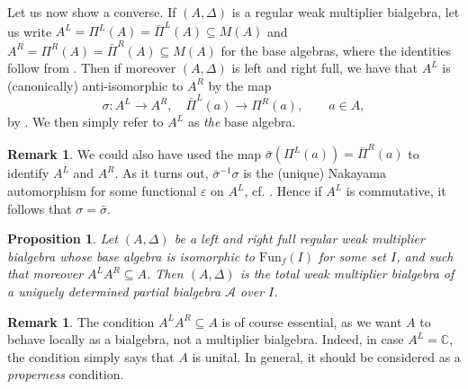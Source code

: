 \documentclass[10pt]{article}
\newcommand{\C}{\mathbb{C}}
\newcommand{\Fun}{\mathrm{Fun}}
\newtheorem{Prop}[Theorem]{Proposition}
\theoremstyle{definition}
\newtheorem{Rem}[Theorem]{Remark}
\numberwithin{equation}{section}
\begin{document}
Let us now show a converse. If $(A,\Delta)$ is a regular weak multiplier bialgebra, let us write $A^L = \Pi^L(A) = \bar{\Pi}^L(A)\subseteq M(A)$ and $A^R = \Pi^R(A)= \bar{\Pi}^R(A)\subseteq M(A)$ for the base algebras, where the identities follow from \cite[Theorem 3.13]{Boh1}. Then if moreover $(A,\Delta)$ is left and right full, we have that $A^L$ is (canonically) anti-isomorphic to $A^R$ by the map \[\sigma: A^L \rightarrow A^R, \quad \bar{\Pi}^L(a) \rightarrow \Pi^R(a), \qquad a\in A,\] by \cite[Lemma 4.8]{Boh1}. We then simply refer to $A^L$ as \emph{the} base algebra. 

\begin{Rem}\label{RemNak} We could also have used the map $\bar{\sigma}(\Pi^L(a)) = \bar{\Pi}^R(a)$ to identify $A^L$ and $A^R$. As it turns out, $\bar{\sigma}^{-1}\sigma$ is the (unique) Nakayama automorphism for some functional $\varepsilon$ on $A^L$, cf. \cite[Proposition 4.9]{Boh1}. Hence if $A^L$ is commutative, it follows that $\sigma = \bar{\sigma}$.
\end{Rem} 

\begin{Prop}\label{PropCharPBA} Let $(A,\Delta)$ be a left and right full regular weak multiplier bialgebra whose base algebra is isomorphic to $\Fun_f(I)$ for some set $I$, and such that moreover $A^LA^R \subseteq A$. Then $(A,\Delta)$ is the total weak multiplier bialgebra of a uniquely determined partial bialgebra $\mathscr{A}$ over $I$.
\end{Prop} 

\begin{Rem} The condition $A^LA^R \subseteq A$ is of course essential, as we want $A$ to behave locally as a bialgebra, not a multiplier bialgebra. Indeed, in case $A^L= \C$, the condition simply says that $A$ is unital. In general, it should be considered as a \emph{properness} condition. %
\end{Rem} 
\end{document}
